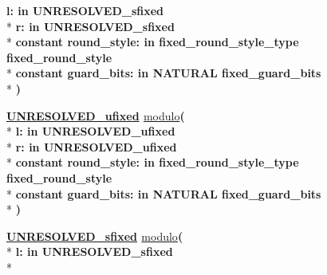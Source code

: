 \begin{DoxyCompactItemize}
{\bfseries \textcolor{vhdlchar}{l\+: }\textcolor{stringliteral}{in }\textcolor{vhdlchar}{U\+N\+R\+E\+S\+O\+L\+V\+E\+D\+\_\+sfixed}}\\*
{\bfseries \textcolor{vhdlchar}{r\+: }\textcolor{stringliteral}{in }\textcolor{vhdlchar}{U\+N\+R\+E\+S\+O\+L\+V\+E\+D\+\_\+sfixed}}\\*
{\bfseries {\bfseries \textcolor{keywordflow}{constant}\textcolor{vhdlchar}{ }}\textcolor{vhdlchar}{round\+\_\+style\+: }\textcolor{stringliteral}{in }\textcolor{vhdlchar}{fixed\+\_\+round\+\_\+style\+\_\+type     fixed\+\_\+round\+\_\+style}}\\*
{\bfseries {\bfseries \textcolor{keywordflow}{constant}\textcolor{vhdlchar}{ }}\textcolor{vhdlchar}{guard\+\_\+bits\+: }\textcolor{stringliteral}{in }\textcolor{vhdlchar}{N\+A\+T\+U\+R\+A\+L     fixed\+\_\+guard\+\_\+bits}}\\*
{\bfseries  )} 
\item 
{\bfseries {\bfseries {\bfseries \hyperlink{classfixed__pkg_ae78bc2b36d22f6abeac163955e8a587d}{U\+N\+R\+E\+S\+O\+L\+V\+E\+D\+\_\+ufixed}} \textcolor{vhdlchar}{ }}} \hyperlink{classfixed__pkg_a5cff73edac1a7495ca003bf5dfebf12b}{modulo}{\bfseries  ( }\\*
{\bfseries \textcolor{vhdlchar}{l\+: }\textcolor{stringliteral}{in }\textcolor{vhdlchar}{U\+N\+R\+E\+S\+O\+L\+V\+E\+D\+\_\+ufixed}}\\*
{\bfseries \textcolor{vhdlchar}{r\+: }\textcolor{stringliteral}{in }\textcolor{vhdlchar}{U\+N\+R\+E\+S\+O\+L\+V\+E\+D\+\_\+ufixed}}\\*
{\bfseries {\bfseries \textcolor{keywordflow}{constant}\textcolor{vhdlchar}{ }}\textcolor{vhdlchar}{round\+\_\+style\+: }\textcolor{stringliteral}{in }\textcolor{vhdlchar}{fixed\+\_\+round\+\_\+style\+\_\+type     fixed\+\_\+round\+\_\+style}}\\*
{\bfseries {\bfseries \textcolor{keywordflow}{constant}\textcolor{vhdlchar}{ }}\textcolor{vhdlchar}{guard\+\_\+bits\+: }\textcolor{stringliteral}{in }\textcolor{vhdlchar}{N\+A\+T\+U\+R\+A\+L     fixed\+\_\+guard\+\_\+bits}}\\*
{\bfseries  )} 
\item 
{\bfseries {\bfseries {\bfseries \hyperlink{classfixed__pkg_aa723b28a027c3c0f9bca02d75e8df4d6}{U\+N\+R\+E\+S\+O\+L\+V\+E\+D\+\_\+sfixed}} \textcolor{vhdlchar}{ }}} \hyperlink{classfixed__pkg_a9f561bf3a259253d79b62c44114986d1}{modulo}{\bfseries  ( }\\*
{\bfseries \textcolor{vhdlchar}{l\+: }\textcolor{stringliteral}{in }\textcolor{vhdlchar}{U\+N\+R\+E\+S\+O\+L\+V\+E\+D\+\_\+sfixed}}\\*

\end{DoxyCompactItemize}
